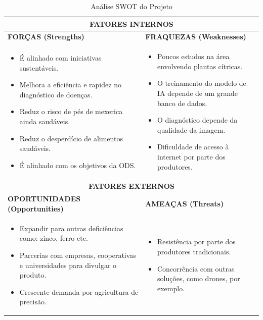 \documentclass[11pt,a4paper]{article}
\begin{document}
\begin{table}[H]
\centering
\caption{Análise SWOT do Projeto}
\label{tab:swot}
\begin{tabular}{|p{7.2cm}|p{7.2cm}|}
\hline
\multicolumn{2}{|c|}{\cellcolor{secondarycolor!20}\textbf{FATORES INTERNOS}} \\
\hline
\textbf{FORÇAS (Strengths)} & \textbf{FRAQUEZAS (Weaknesses)} \\
\hline
\begin{minipage}[t]{7cm}
\begin{itemize}[left=0pt]
  \item É alinhado com iniciativas sustentáveis.
  \item Melhora a eficiência e rapidez no diagnóstico de doenças.
  \item Reduz o risco de pés de mexerica ainda saudáveis.
  \item Reduz o desperdício de alimentos saudáveis.
  \item É alinhado com os objetivos da ODS.
\end{itemize}
\end{minipage}
&
\begin{minipage}[t]{7cm}
\begin{itemize}[left=0pt]
  \item Poucos estudos na área envolvendo plantas cítricas.
  \item O treinamento do modelo de IA depende de um grande banco de dados.
  \item O diagnóstico depende da qualidade da imagem.
  \item Dificuldade de acesso à internet por parte dos produtores.
\end{itemize}
\end{minipage}
\\
\hline
\multicolumn{2}{|c|}{\cellcolor{secondarycolor!20}\textbf{FATORES EXTERNOS}} \\
\hline
\textbf{OPORTUNIDADES (Opportunities)} & \textbf{AMEAÇAS (Threats)} \\
\hline
\begin{minipage}[t]{7cm}
\begin{itemize}[left=0pt]
  \item Expandir para outras deficiências como: zinco, ferro etc.
  \item Parcerias com empresas, cooperativas e universidades para divulgar o produto.
  \item Crescente demanda por agricultura de precisão.
\end{itemize}
\end{minipage}
&
\begin{minipage}[t]{7cm}
\begin{itemize}[left=0pt]
  \item Resistência por parte dos produtores tradicionais.
  \item Concorrência com outras soluções, como drones, por exemplo.
\end{itemize}
\end{minipage}
\\
\hline
\end{tabular}
\end{table}
\end{document}
